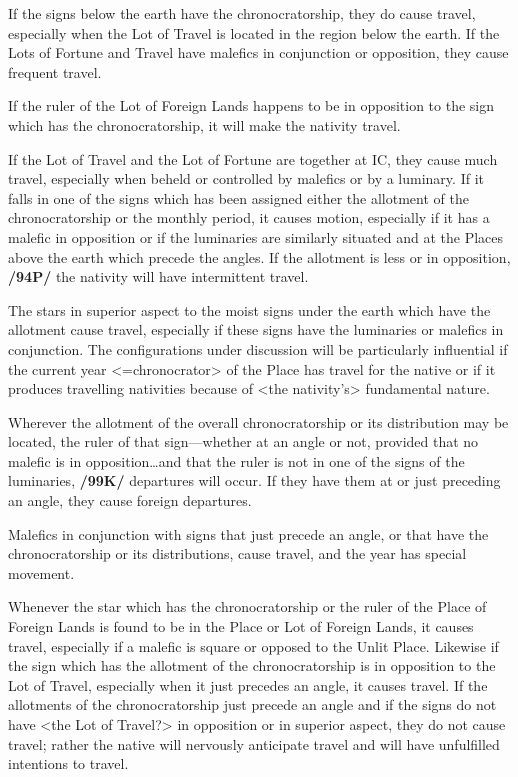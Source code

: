 If the signs below the earth have the chronocratorship, they do cause travel, especially when the Lot of Travel is located in the region below the earth. If the Lots of Fortune and Travel have malefics in conjunction or opposition, they cause frequent
travel. 

If the ruler of the Lot of Foreign Lands happens to be in opposition to the sign which has the chronocratorship, it will make the nativity travel. 

If the Lot of Travel and the Lot of Fortune are together at
IC, they cause much travel, especially when beheld or controlled by malefics or by a luminary. If it falls in
one of the signs which has been assigned either the allotment of the chronocratorship or the monthly period, it causes motion, especially if it has a malefic in opposition or if the luminaries are similarly situated and at the Places above the earth which precede the angles. If the allotment is less or in
opposition, \textbf{/94P/} the nativity will have intermittent travel. 

The stars in superior aspect to the moist signs under the earth which have the allotment cause travel, especially if these signs have the luminaries or malefics in conjunction. The configurations under discussion will be particularly influential if the current year <=chronocrator> of the Place has travel for the native or if it produces travelling nativities because of <the nativity’s> fundamental nature. 

Wherever the allotment of the overall chronocratorship or its distribution may be located, the ruler of that sign—whether at an angle or not, provided that no malefic is in opposition\ldots and that the ruler is not in one of the signs of the luminaries, \textbf{/99K/} departures will occur. If they have them at or just preceding an angle, they cause foreign departures.

Malefics in conjunction with signs that just precede an angle, or that have the chronocratorship or its distributions, cause travel, and the year has special movement. 

Whenever the star which has the chronocratorship or the ruler of the Place of Foreign Lands is found to be in the Place or Lot of Foreign Lands, it causes travel, especially if a malefic is square or opposed to the Unlit Place. Likewise if the sign which has the allotment of the chronocratorship is in opposition to the Lot of Travel, especially when it just precedes an angle, it causes travel. If the allotments of the chronocratorship just precede an angle and if the signs do not have <the Lot of Travel?> in opposition or in superior aspect, they do not cause travel; rather the native will nervously anticipate travel and will have unfulfilled intentions to travel. 

